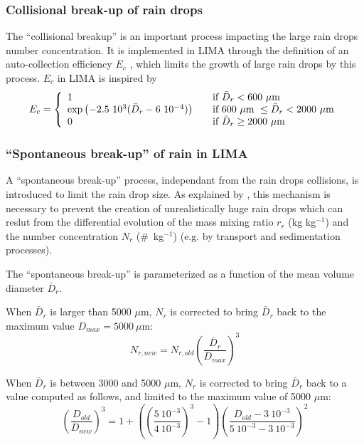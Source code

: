 {\subsubsection{Collisional break-up of rain drops}

The ``collisional breakup'' is an important process impacting the large rain drops number concentration. It is implemented in LIMA through the definition of an auto-collection efficiency $E_c$ \citep[as introduced by][]{Ziegler1985,Verlinde1990}, which limits the growth of large rain drops by this process. $E_c$ in LIMA is inspired by \citet[][their Eq.\ (4.22)]{Verlinde1993}
\begin{align}
 E_c = \left\{
  \begin{array}{l l}
    1 & \quad \text{if } \bar{D}_r < 600~\mu\text{m} \\
    \exp \left( -2.5~10^3 (\bar{D}_r - 6~10^{-4}) \right) & \quad \text{if } 600~\mu\text{m } \leq \bar{D}_r < 2000~\mu\text{m}\\
    0 & \quad \text{if } \bar{D}_r \ge 2000~\mu\text{m}
  \end{array} \right. 
\end{align}

\subsubsection{``Spontaneous break-up'' of rain in LIMA}

A ``spontaneous break-up'' process, independant from the rain drops collisions, is introduced to limit the rain drop size. As explained by \citet{Cohard2000c2r2test}, this mechanism is necessary to prevent the creation of unrealistically huge rain drops which can reslut from the differential evolution of the mass mixing ratio $r_r$ (kg kg$^{-1}$) and the number concentration $N_r$ ($\#$~kg$^{-1}$) (e.g. by transport and sedimentation processes).

The ``spontaneous break-up'' is parameterized as a function of the mean volume diameter $\bar{D}_r$.

When $\bar{D}_r$ is larger than 5000 $\mu$m, $N_r$ is corrected to bring $\bar{D}_r$ back to the maximum value $D_{max} = 5000~\mu$m:
\begin{equation}
 N_{r,new} = N_{r,old} \left( \frac{\bar{D}_r}{D_{max}} \right)^3
\end{equation}

When $\bar{D}_r$ is between 3000 and 5000 $\mu$m, $N_r$ is corrected to bring $\bar{D}_r$ back to a value computed as follows, and limited to the maximum value of 5000 $\mu$m:
\begin{equation}
 \left(\frac{D_{old}}{D_{new}}\right)^3 = 1 + \left( \left(\frac{5~10^{-3}}{4~10^{-3}}\right)^3 - 1 \right) \left( \frac{D_{old}-3~10^{-3}}{5~10^{-3}-3~10^{-3}} \right)^2
\end{equation}




}
